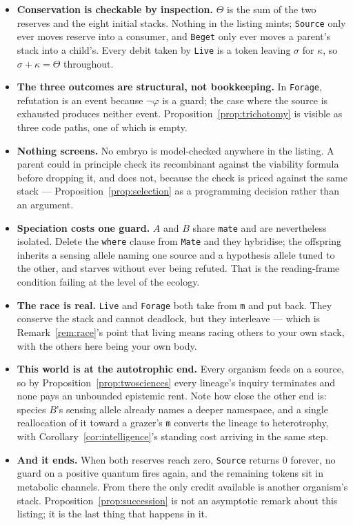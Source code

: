 \documentclass[11pt]{article}
\theoremstyle{plain}
\theoremstyle{definition}
\begin{document}
\begin{itemize}
\item \textbf{Conservation is checkable by inspection.} $\Theta$ is the sum of the two reserves and
the eight initial stacks. Nothing in the listing mints; \texttt{Source} only ever moves reserve into a
consumer, and \texttt{Beget} only ever moves a parent's stack into a child's. Every debit taken by
\texttt{Live} is a token leaving $\sigma$ for $\kappa$, so $\sigma + \kappa = \Theta$ throughout.

\item \textbf{The three outcomes are structural, not bookkeeping.} In \texttt{Forage}, refutation is
an event because $\lnot\varphi$ is a guard; the case where the source is exhausted produces neither
event. Proposition~\ref{prop:trichotomy} is visible as three code paths, one of which is empty.

\item \textbf{Nothing screens.} No embryo is model-checked anywhere in the listing. A parent could
in principle check its recombinant against the viability formula before dropping it, and does not,
because the check is priced against the same stack --- Proposition~\ref{prop:selection} as a
programming decision rather than an argument.

\item \textbf{Speciation costs one guard.} $A$ and $B$ share \texttt{mate} and are nevertheless
isolated. Delete the \texttt{where} clause from \texttt{Mate} and they hybridise; the offspring
inherits a sensing allele naming one source and a hypothesis allele tuned to the other, and starves
without ever being refuted. That is the reading-frame condition failing at the level of the ecology.

\item \textbf{The race is real.} \texttt{Live} and \texttt{Forage} both take from \texttt{m} and put
back. They conserve the stack and cannot deadlock, but they interleave --- which is
Remark~\ref{rem:race}'s point that living means racing others to your own stack, with the others
here being your own body.

\item \textbf{This world is at the autotrophic end.} Every organism feeds on a source, so by
Proposition~\ref{prop:twosciences} every lineage's inquiry terminates and none pays an unbounded
epistemic rent. Note how close the other end is: species $B$'s sensing allele already names a deeper
namespace, and a single reallocation of it toward a grazer's \texttt{m} converts the lineage to
heterotrophy, with Corollary~\ref{cor:intelligence}'s standing cost arriving in the same step.

\item \textbf{And it ends.} When both reserves reach zero, \texttt{Source} returns $0$ forever, no
guard on a positive quantum fires again, and the remaining tokens sit in metabolic channels. From
there the only credit available is another organism's stack. Proposition~\ref{prop:succession} is not
an asymptotic remark about this listing; it is the last thing that happens in it.
\end{itemize}
\end{document}
